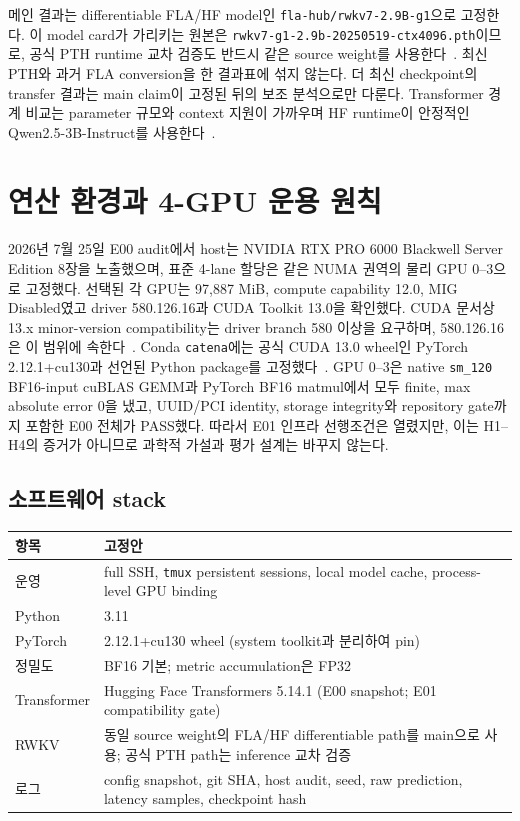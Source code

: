 \documentclass[10.5pt,a4paper]{article}
\newcommand{\code}[1]{\texttt{#1}}
\begin{document}
메인 결과는 differentiable FLA/HF model인 \code{fla-hub/rwkv7-2.9B-g1}으로 고정한다. 이 model card가 가리키는 원본은 \code{rwkv7-g1-2.9b-20250519-ctx4096.pth}이므로, 공식 PTH runtime 교차 검증도 반드시 같은 source weight를 사용한다~\citep{rwkvmodel}. 최신 PTH와 과거 FLA conversion을 한 결과표에 섞지 않는다. 더 최신 checkpoint의 transfer 결과는 main claim이 고정된 뒤의 보조 분석으로만 다룬다. Transformer 경계 비교는 parameter 규모와 context 지원이 가까우며 HF runtime이 안정적인 Qwen2.5-3B-Instruct를 사용한다~\citep{qwen25model,qwen25report}.

\section{연산 환경과 4-GPU 운용 원칙}

2026년 7월 25일 E00 audit에서 host는 NVIDIA RTX PRO 6000 Blackwell Server Edition 8장을 노출했으며, 표준 4-lane 할당은 같은 NUMA 권역의 물리 GPU 0--3으로 고정했다. 선택된 각 GPU는 97,887 MiB, compute capability 12.0, MIG Disabled였고 driver 580.126.16과 CUDA Toolkit 13.0을 확인했다. CUDA 문서상 13.x minor-version compatibility는 driver branch 580 이상을 요구하며, 580.126.16은 이 범위에 속한다~\citep{rtxpro6000,cuda13compat}. Conda \code{catena}에는 공식 CUDA 13.0 wheel인 PyTorch 2.12.1+cu130과 선언된 Python package를 고정했다~\citep{pytorch212}. GPU 0--3은 native \code{sm\_120} BF16-input cuBLAS GEMM과 PyTorch BF16 matmul에서 모두 finite, max absolute error 0을 냈고, UUID/PCI identity, storage integrity와 repository gate까지 포함한 E00 전체가 PASS했다. 따라서 E01 인프라 선행조건은 열렸지만, 이는 H1--H4의 증거가 아니므로 과학적 가설과 평가 설계는 바꾸지 않는다.

\subsection{소프트웨어 stack}

\begin{tabularx}{\textwidth}{@{}L{38mm}Y@{}}
\toprule
항목 & 고정안 \\
\midrule
운영 & full SSH, \code{tmux} persistent sessions, local model cache, process-level GPU binding \\
Python & 3.11 \\
PyTorch & 2.12.1+cu130 wheel (system toolkit과 분리하여 pin) \\
정밀도 & BF16 기본; metric accumulation은 FP32 \\
Transformer & Hugging Face Transformers 5.14.1 (E00 snapshot; E01 compatibility gate) \\
RWKV & 동일 source weight의 FLA/HF differentiable path를 main으로 사용; 공식 PTH path는 inference 교차 검증 \\
로그 & config snapshot, git SHA, host audit, seed, raw prediction, latency samples, checkpoint hash \\
\bottomrule
\end{tabularx}
\end{document}
